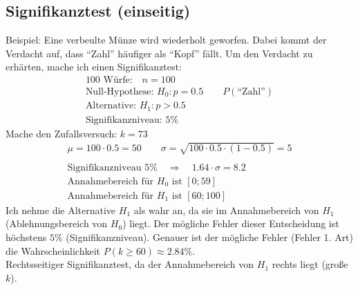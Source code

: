 \subsection{Signifikanztest (einseitig)}
Beispiel: Eine verbeulte Münze wird wiederholt geworfen. Dabei kommt der Verdacht auf, dass ``Zahl'' häufiger als ``Kopf'' fällt. Um den Verdacht zu erhärten, mache ich einen Signifikanztest:
\begin{gather*}
  100\text{ Würfe:} \quad n = 100 \\
  \text{Null-Hypothese: } H_0 \colon p = 0.5 \qquad P(\text{``Zahl''}) \\
  \text{Alternative: } H_1 \colon p > 0.5 \\
  \text{Signifikanzniveau: } 5\%
\end{gather*}
Mache den Zufallsversuch: $k = 73$
\begin{gather*}
  \mu = 100 \cdot 0.5 = 50 \qquad \sigma = \sqrt{100 \cdot 0.5 \cdot (1 - 0.5)} = 5 \\\\
  \text{Signifikanzniveau } 5\% \quad\Rightarrow\quad 1.64 \cdot \sigma = 8.2 \\
  \text{Annahmebereich für $H_0$ ist } [0; 59] \\
  \text{Annahmebereich für $H_1$ ist } [60; 100]
\end{gather*}
Ich nehme die Alternative $H_1$ als wahr an, da sie im Annahmebereich von $H_1$ (Ablehnungsbereich von $H_0$) liegt. Der mögliche Fehler dieser Entscheidung ist höchstens $5\%$ (Signifikanzniveau). Genauer ist der mögliche Fehler (Fehler 1. Art) die Wahrscheinlichkeit $P(k \geq 60) \approx 2.84\%$. \\
Rechtsseitiger Signifikanztest, da der Annahmebereich von $H_1$ rechts liegt (große $k$).
